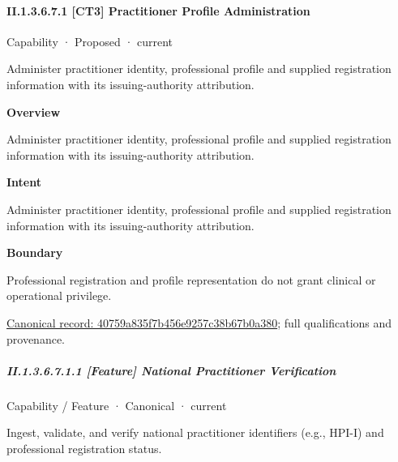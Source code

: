 \paragraph*{II.1.3.6.7.1 [CT3] Practitioner Profile Administration}
\label{navigation:II.1.3.6.7.1}

\label{element:40759a835f7b456e9257c38b67b0a380}
{\small Capability · Proposed · current}\par

Administer practitioner identity, professional profile and supplied registration information with its issuing-authority attribution.



\textbf{Overview}



Administer practitioner identity, professional profile and supplied registration information with its issuing-authority attribution.



\textbf{Intent}



Administer practitioner identity, professional profile and supplied registration information with its issuing-authority attribution.



\textbf{Boundary}



Professional registration and profile representation do not grant clinical or operational privilege.


{\footnotesize \href{../../../../continuum/strategy/capability/40759a835f7b456e9257c38b67b0a380.md}{Canonical record: 40759a835f7b456e9257c38b67b0a380}; full qualifications and provenance.}\par
\subparagraph*{II.1.3.6.7.1.1 [Feature] National Practitioner Verification}
\label{navigation:II.1.3.6.7.1.1}

\label{element:12c5a17dcc564619a6a9222dd2e15528}
{\small Capability / Feature · Canonical · current}\par

Ingest, validate, and verify national practitioner identifiers (e.g., HPI-I) and professional registration status.



